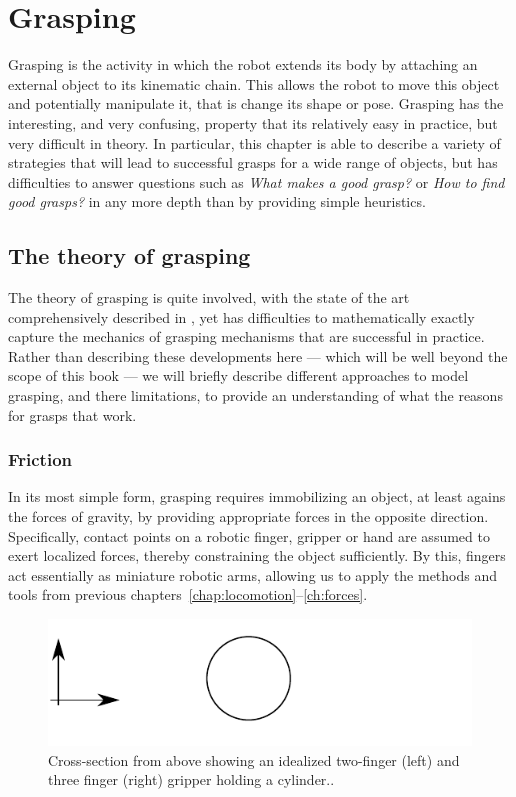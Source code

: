 \chapter{Grasping}
Grasping is the activity in which the robot extends its body by attaching an external object to its kinematic chain. This allows the robot to move this object and potentially manipulate it, that is change its shape or pose. Grasping has the interesting, and very confusing, property that its relatively easy in practice, but very difficult in theory. In particular, this chapter is able to describe a variety of strategies that will lead to successful grasps for a wide range of objects, but has difficulties to answer questions such as \emph{What makes a good grasp?} or \emph{How to find good grasps?} in any more depth than by providing simple heuristics.

\section{The theory of grasping}
The theory of grasping is quite involved, with the state of the art comprehensively described in \cite{rimon2019mechanics}, yet has difficulties to mathematically exactly capture the mechanics of grasping mechanisms that are successful in practice. Rather than describing these developments here --- which will be well beyond the scope of this book --- we will briefly describe different approaches to model grasping, and there limitations, to provide an understanding of what the reasons for grasps that work.

\subsection{Friction}
In its most simple form, grasping requires immobilizing an object, at least agains the forces of gravity, by providing appropriate forces in the opposite direction. Specifically, contact points on a robotic finger, gripper or hand are assumed to exert localized forces, thereby constraining the object sufficiently. By this, fingers act essentially as miniature robotic arms, allowing us to apply the methods and tools from previous chapters~\ref{chap:locomotion}--\ref{ch:forces}.

\begin{figure}
\includegraphics[width=\columnwidth]{figs/idealgrasp}
\caption{Cross-section from above showing an idealized two-finger (left) and three finger (right) gripper holding a cylinder.\label{fig:idealgrasp}.}
\end{figure}

